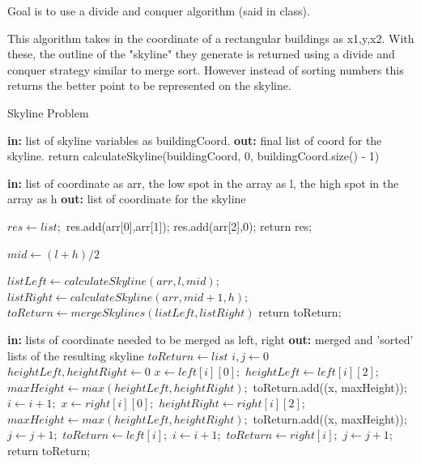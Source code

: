 \documentclass{article}
\begin{document}
Goal is to use a divide and conquer algorithm (said in class).

This algorithm takes in the coordinate of a rectangular buildings as {x1,y,x2}. With these, the outline of the "skyline" they generate is returned using a divide and conquer strategy similar to merge sort. However instead of sorting numbers this returns the better point to be represented on the skyline.

  	\begin{algorithm}
	\caption{Skyline Problem}\label{skyline}
        \begin{algorithmic}[1]
		 \State \textbf{in: } list of skyline variables as buildingCoord.
		 \State \textbf{out: } final list of coord for the skyline.
		 \State return calculateSkyline(buildingCoord, 0, buildingCoord.size() - 1)	
		 \EndProcedure
		 
		 \State \textbf{in: } list of coordinate as arr, the low spot in the array as l, the high spot in the array as h
		 \State \textbf{out: } list of coordinate for the skyline
		 
		 \State $res \gets list;$
		 \State res.add(arr[0],arr[1]);
		 \State res.add(arr[2],0);
		 \State return res;
		 \EndIf
		 
		 \State $mid\gets (l + h)/2$
		 
		 \State $listLeft \gets calculateSkyline(arr, l, mid);$
		 \State $listRight \gets calculateSkyline(arr, mid + 1, h);$
		 \State $toReturn \gets mergeSkylines(listLeft, listRight)$
		 \State return toReturn;
		 
		 \EndProcedure
		 
		  \State \textbf{in: } lists of coordinate needed to be merged as left, right
		 \State \textbf{out: } merged and 'sorted' lists of the resulting skyline
		 \State $toReturn \gets list$
		 \State $i, j \gets 0$
		 \State $heightLeft, heightRight \gets 0$
		\State $x \gets left[i][0];$
		\State $heightLeft \gets left[i][2];$
		\State $maxHeight \gets max(heightLeft, heightRight);$
		\State toReturn.add((x, maxHeight));
		\State $i \gets i + 1;$
		\Else
		\State $x \gets right[i][0];$
		\State $heightRight \gets right[i][2];$
		\State $maxHeight \gets max(heightLeft, heightRight);$
		\State toReturn.add((x, maxHeight));
		\State $j \gets j + 1;$
		\EndIf
		\EndWhile
		\State $toReturn \gets left[i];$
		\State $i \gets i + 1;$
		\EndWhile
		\State $toReturn \gets right[i];$
		\State $j \gets j + 1;$
		\EndWhile
		\State return toReturn;
		\EndProcedure
		 
	\end{algorithmic}
	\end{algorithm}
\end{document}

